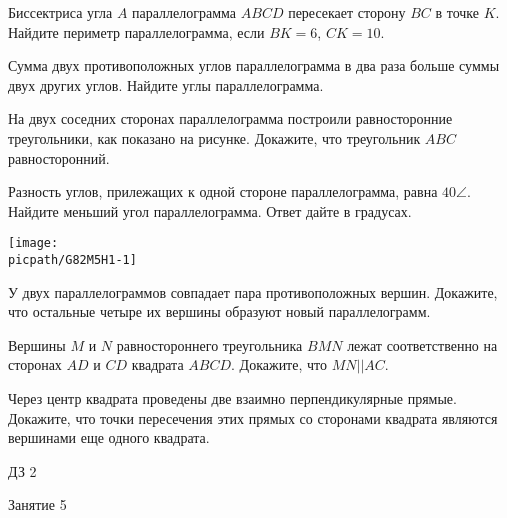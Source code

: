 \begin{class}[number=4]
	\begin{listofex}
		\item Биссектриса угла \( A \) параллелограмма \( ABCD \) пересекает сторону \( BC \) в точке \( K \). Найдите периметр параллелограмма, если \( BK  =  6 \), \( CK  =  10 \).
		\item Сумма двух противоположных углов параллелограмма в два раза больше суммы двух других углов. Найдите углы параллелограмма.
		\item На двух соседних сторонах параллелограмма построили равносторонние треугольники, как показано на рисунке. Докажите, что треугольник \( ABC \) равносторонний.
		\item Разность углов, прилежащих к одной стороне параллелограмма, равна \( 40\angle \). Найдите меньший угол параллелограмма. Ответ дайте в градусах.
		\begin{center}
			\texttt{[image: \\picpath/G82M5H1-1]}
		\end{center}
		\item У двух параллелограммов совпадает пара противоположных вершин. Докажите, что остальные четыре их вершины образуют новый параллелограмм.
		\item Вершины \( M \) и \( N \) равностороннего треугольника \( BMN \)
		лежат соответственно на сторонах \( AD \) и \( CD \) квадрата \( ABCD \).
		Докажите, что \( MN || AC \).
		\item Через центр квадрата проведены две взаимно
		перпендикулярные прямые. Докажите, что точки пересечения этих
		прямых со сторонами квадрата являются вершинами еще одного
		квадрата.
	\end{listofex}
\end{class}

\begin{homework}[number=1]
	\begin{listofex}
		\item ДЗ 2
	\end{listofex}
\end{homework}

\begin{class}[number=5]
	\begin{listofex}
		\item Занятие 5
	\end{listofex}
\end{class}

